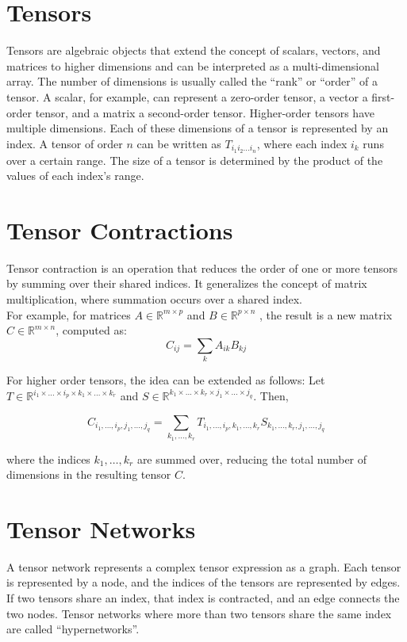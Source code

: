 \section{Tensors}
Tensors are algebraic objects that extend the concept of scalars, vectors, and matrices to higher dimensions and can be interpreted as a multi-dimensional array. The number of dimensions is usually called the ``rank'' or ``order'' of a tensor. A scalar, for example, can represent a zero-order tensor, a vector a first-order tensor, and a matrix a second-order tensor. Higher-order tensors have multiple dimensions. 
Each of these dimensions of a tensor is represented by an index. 
A tensor of order $ n $ can be written as $ T_{i_1 i_2 \dots i_n} $, where each index $ i_k $ runs over a certain range.
The size of a tensor is determined by the product of the values of each index’s range.

\section{Tensor Contractions}
\noindent Tensor contraction is an operation that reduces the order of one or more tensors by summing over their shared indices. It generalizes the concept of matrix multiplication, where summation occurs over a shared index. \\
For example, for matrices $A\in \mathbb{R}^{m\times p}$ and $B\in \mathbb{R}^{p\times n}$ , the result is a new matrix $C\in \mathbb{R}^{m\times n}$, computed as:
$$
C_{ij} = \sum_{k} A_{ik} B_{kj}
$$

\noindent For higher order tensors, the idea can be extended as follows: Let $T\in \mathbb{R}^{i_1\times ... \times i_p\times k_1 \times ... \times k_r}$ and $S\in \mathbb{R}^{k_1 \times ... \times k_r\times j_1 \times ... \times j_q}$. Then,

$$
C_{i_1, \dots, i_p, j_1, \dots, j_q} = \sum_{k_1, \dots, k_r} T_{i_1, \dots, i_p, k_1, \dots, k_r} S_{k_1, \dots, k_r, j_1, \dots, j_q}
$$

\noindent where the indices $ k_1, \dots, k_r $ are summed over, reducing the total number of dimensions in the resulting tensor $ C $.

\section{Tensor Networks}
A tensor network represents a complex tensor expression as a graph. Each tensor is represented by a node, and the indices of the tensors are represented by edges. If two tensors share an index, that index is contracted, and an edge connects the two nodes. Tensor networks where more than two tensors share the same index are called ``hypernetworks''. 

